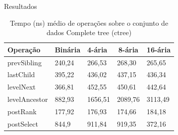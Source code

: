 \begin{frame}{Resultados}
\begin{table}[]
    \centering
    \caption[Tempo médio de operações]{Tempo (ns) médio de operações sobre o conjunto de dados Complete tree (ctree)}
    \begin{tabular}{lllll}
    \hline
    \multicolumn{1}{l}{\textbf{Operação}} & \multicolumn{1}{l}{\textbf{Binária}} & \multicolumn{1}{l}{\textbf{4-ária}} & \multicolumn{1}{c}{\textbf{8-ária}} & \multicolumn{1}{l}{\textbf{16-ária}} \\ \hline
    prevSibling                             & 240,24                                & 266,53                               & 268,30                               & 265,65                                \\
    \rowcolor[HTML]{EFEFEF} 
    lastChild                               & 395,22                                & 436,02                               & 437,15                               & 436,34                                \\
    levelNext                               & 366,81                                & 452,55                               & 450,61                               & 442,64                                \\
    \rowcolor[HTML]{EFEFEF} 
    levelAncestor                           & 882,93                                & 1656,51                              & 2089,76                              & 3113,49                               \\
    postRank                                & 177,92                                & 176,93                               & 174,66                               & 184,18                                \\
    \rowcolor[HTML]{EFEFEF} 
    postSelect                              & 844,9                                 & 911,84                               & 919,35                             & 372,16                 \\ \hline              
    \end{tabular}
    \end{table}
\end{frame}

